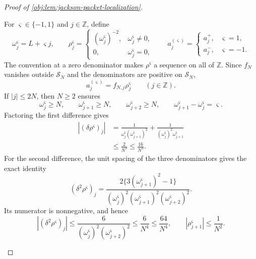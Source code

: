 \documentclass[11pt]{article}
\begin{document}
\begin{proof}[Proof of \cref{obj:lem:jackson-packet-localization}]
\begin{enumerate}
For \(\varsigma\in\{-1,1\}\) and \(j\in\mathbb Z\), define
\[
\omega_j^{\varsigma}=L+\varsigma j,\qquad
\rho_j^{\varsigma}=
\begin{cases}
(\omega_j^{\varsigma})^{-2},&\omega_j^{\varsigma}\neq0,\\
0,&\omega_j^{\varsigma}=0,
\end{cases}
\qquad
a_j^{(\varsigma)}=
\begin{cases}
a_j^+,&\varsigma=1,\\
a_j^-,&\varsigma=-1.
\end{cases}
\]
The convention at a zero denominator makes \(\rho^{\varsigma}\) a sequence on all of \(\mathbb Z\). Since \(f_N\) vanishes outside \(\mathcal S_N\) and the denominators are positive on \(\mathcal S_N\),
\[
a_j^{(\varsigma)}=f_{N,j}\rho_j^{\varsigma}
\qquad(j\in\mathbb Z).
\]
If \(|j|\leq2N\), then \(N\geq2\) ensures
\[
\omega_j^{\varsigma}\geq N,\qquad
\omega_{j+1}^{\varsigma}\geq N,\qquad
\omega_{j+2}^{\varsigma}\geq N,
\qquad
\omega_{j+1}^{\varsigma}-\omega_j^{\varsigma}=\varsigma.
\]
Factoring the first difference gives
\[
\begin{aligned}
|(\delta\rho^{\varsigma})_j|
&=
\frac1{\omega_j^{\varsigma}(\omega_{j+1}^{\varsigma})^2}
+\frac1{(\omega_j^{\varsigma})^2\omega_{j+1}^{\varsigma}}\\
&\leq\frac2{N^3}\leq\frac{16}{N^3}.
\end{aligned}
\]
For the second difference, the unit spacing of the three denominators gives the exact identity
\[
(\delta^2\rho^{\varsigma})_j
=
\frac{2\{3(\omega_{j+1}^{\varsigma})^2-1\}}
 {(\omega_j^{\varsigma})^2
  (\omega_{j+1}^{\varsigma})^2
  (\omega_{j+2}^{\varsigma})^2}.
\]
Its numerator is nonnegative, and hence
\[
|(\delta^2\rho^{\varsigma})_j|
\leq
\frac6{(\omega_j^{\varsigma})^2(\omega_{j+2}^{\varsigma})^2}
\leq\frac6{N^4}\leq\frac{64}{N^4},
\qquad
|\rho_{j+1}^{\varsigma}|\leq\frac1{N^2}.
\]


\end{enumerate}
\end{proof}
\end{document}

